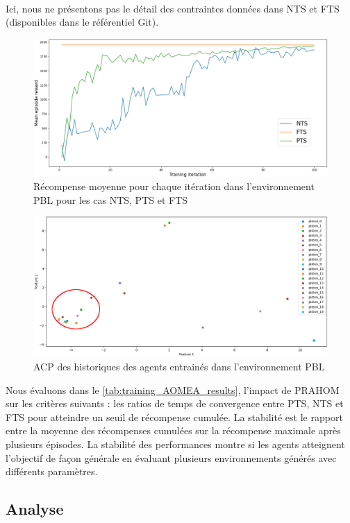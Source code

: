 \

\noindent Ici, nous ne présentons pas le détail des contraintes données dans NTS et FTS (disponibles dans le référentiel Git\footnotemark[2]).
%
\begin{figure}[h!]
  \centering
  \includegraphics[width=0.76\linewidth]{figures/prahom_learning_curve.png}
  \caption{Récompense moyenne pour chaque itération dans l'environnement PBL pour les cas NTS, PTS et FTS}
  \label{fig:prahom_learning_curve}
\end{figure}
%
\begin{figure}[h!]
  \centering
  \includegraphics[width=0.75\linewidth]{figures/prahom_pca_analysis.png}
  \caption{ACP des historiques des agents entrainés dans l'environnement PBL}
  \label{fig:prahom_pca_analysis}
\end{figure}
%
Nous évaluons dans le \autoref{tab:training_AOMEA_results}, l'impact de PRAHOM sur les critères suivants : les ratios de temps de convergence entre PTS, NTS et FTS pour atteindre un seuil de récompense cumulée. La stabilité est le rapport entre la moyenne des récompenses cumulées sur la récompense maximale après plusieurs épisodes. La stabilité des performances montre si les agents atteignent l'objectif de façon générale en évaluant plusieurs environnements générés avec différents paramètres.



\subsection{Analyse}

